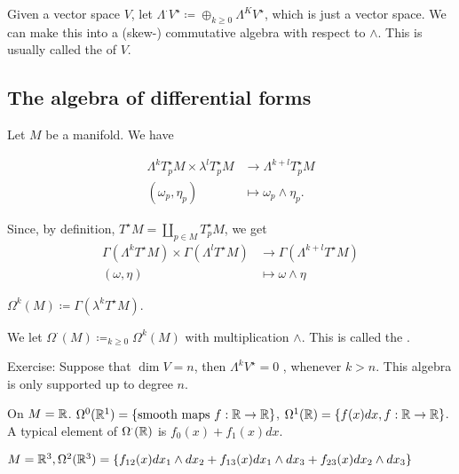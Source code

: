 \begin{definition*}
    Given a vector space \(V\), let \(\Lambda^\cdot V^\star\coloneqq \oplus_{k\geq 0} \Lambda^KV^\star\),
    which is just a vector space. We can make this into a (skew-) commutative algebra with respect to \(\wedge\).
    This is usually called the  of \(V\).
\end{definition*}

\subsection{The algebra of differential forms}

Let \(M\) be a manifold. We have 

\begin{align*}
    \Lambda^k T_p^\star M\times \lambda^l T_p^\star M&\to \Lambda^{k+l}T_p^\star M\\
    (\omega_p,\eta_p)&\mapsto \omega_p\wedge \eta_p.
\end{align*}

Since, by definition, \(T^\star M=\coprod_{p\in M} T_p^\star M\), we get 
\begin{align*}
    \Gamma(\Lambda^k T^\star M)\times \Gamma(\Lambda^lT^\star M)&\to \Gamma(\Lambda^{k+l}T^\star M)\\
    (\omega,\eta)&\mapsto \omega \wedge \eta
\end{align*}

 \(\Omega^k(M)\coloneqq \Gamma(\lambda^k T^\star M)\).

We let \(\Omega^\cdot(M)\coloneqq_{k\geq 0} \Omega^k(M)\) with multiplication \(\wedge\).
This is called the .

Exercise: Suppose that \(\dim V=n\), then \(\Lambda^k V^\star=0\) , whenever \(k>n\). This algebra is only supported up to degree \(n\).

\begin{example}
    On \(M=\mathbb{R}\). \(\Omega^0(\mathbb{R}^1)=\{\text{smooth maps }f:\mathbb{R}\to\mathbb{R}\}\),
    \(\Omega^1(\mathbb{R})=\{f(x)dx,f:\mathbb{R}\to\mathbb{R}\}\). A typical element of \(\Omega^\cdot(\mathbb{R})\) is 
    \(f_0(x)+f_1(x)dx\).
\end{example}

\begin{example}
    \(M=\mathbb{R}^3,\Omega^2(\mathbb{R}^3)=\{f_{12}(x)dx_1\wedge dx_2+f_{13}(x)dx_1\wedge dx_3+ f_{23}(x)dx_2\wedge dx_3\}\)
\end{example}

